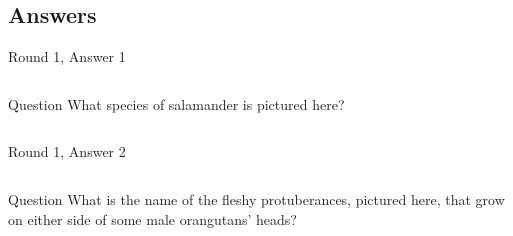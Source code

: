 \documentclass[11pt]{beamer}
\begin{document}
\subsection{Answers}
\begin{frame}[t]{Round 1, Answer 1}
\begin{columns}[T,totalwidth=\linewidth]
\begin{column}{0.32\linewidth}
\begin{block}{Question}
What species of salamander is pictured here?
\end{block}
\end{column}
\begin{column}{0.65\linewidth}
\begin{center}
\texttt{[image: \{Images/axolotl]}.jpg}
\end{center}
\end{column}
\end{columns}
\end{frame}
\begin{frame}[t]{Round 1, Answer 2}
\begin{columns}[T,totalwidth=\linewidth]
\begin{column}{0.32\linewidth}
\begin{block}{Question}
What is the name of the fleshy protuberances, pictured here, that grow on either side of some male orangutans' heads?
\end{block}
\end{column}
\begin{column}{0.65\linewidth}
\begin{center}
\texttt{[image: \{Images/orangutan]}.jpg}
\end{center}
\end{column}
\end{columns}
\end{frame}
\end{document}
